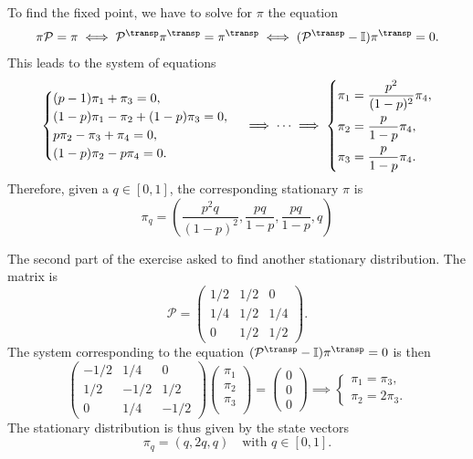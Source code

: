 To find the fixed point, we have to solve for $\pi$ the equation
\begin{equation}
  \pi \mathcal{P} = \pi \iff \mathcal{P}\tran \pi\tran = \pi\tran
  \iff (\mathcal{P}\tran - \I) \pi\tran = 0.
\end{equation}
This leads to the system of equations
\begin{equation}
  \begin{cases}
    (p-1)\pi_1 + \pi_3 = 0, \\
    (1-p)\pi_1 - \pi_2 +(1-p)\pi_3 = 0, \\
    p\pi_2 - \pi_3 + \pi_4 = 0, \\
    (1-p)\pi_2 - p\pi_4 = 0.
  \end{cases}
  \implies \dots \implies
  \begin{dcases}
    \pi_1 = \frac{p^{2}}{(1-p)^{2}}\pi_4, \\
    \pi_2 = \frac{p}{1-p}\pi_4, \\
    \pi_3 = \frac{p}{1-p}\pi_4.
  \end{dcases}
\end{equation}
Therefore, given a $q \in [0,1]$, the corresponding stationary $\pi$ is
\begin{equation}
  \pi_{q} = \left(\frac{p^{2}q}{(1-p)^{2}}, \frac{pq}{1-p}, \frac{pq}{1-p},
  q\right)
\end{equation}

The second part of the exercise asked to find another stationary distribution.
The matrix is
\begin{equation}
    \mathcal{P} =
    \begin{pmatrix}
        1/2 & 1/2 &  0  \\
        1/4 & 1/2 & 1/4 \\
         0  & 1/2 & 1/2
    \end{pmatrix}.
\end{equation}
The system corresponding to the equation $(\mathcal{P}\tran - \I) \pi\tran = 0$
is then
\begin{equation}
  \begin{pmatrix}
    -1/2 & 1/4 & 0 \\
    1/2 & -1/2 & 1/2 \\
    0 & 1/4 & -1/2
  \end{pmatrix}
  \begin{pmatrix}
    \pi_1 \\ \pi_2 \\ \pi_3 \\
  \end{pmatrix}
  =
  \begin{pmatrix}
    0 \\ 0 \\ 0
  \end{pmatrix}
  \implies
  \begin{cases}
    \pi_1 = \pi_3, \\
    \pi_2 = 2\pi_3.
  \end{cases}
\end{equation}
The stationary distribution is thus given by the state vectors
\begin{equation}
  \pi_q = (q, 2q, q) \quad\text{with } q \in [0, 1].
\end{equation}
